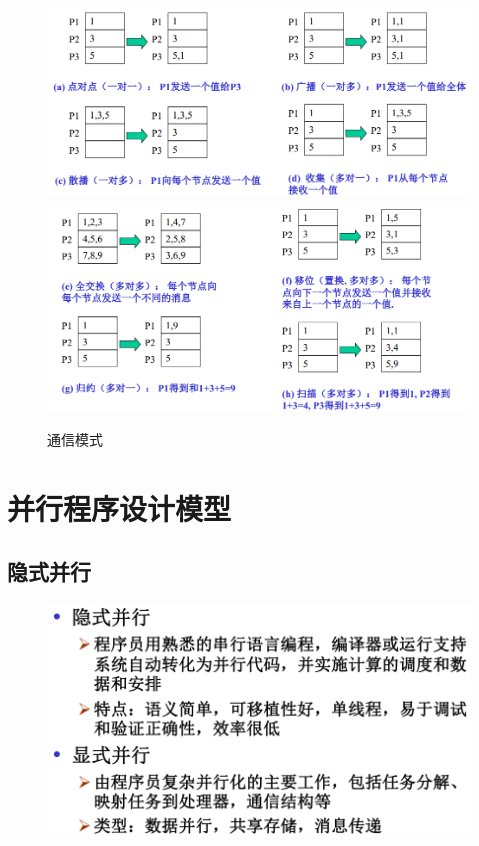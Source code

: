 \documentclass[UTF8,a4paper]{ctexart}
\begin{document}
\begin{figure}[H]
  \centering
  \includegraphics[scale = 0.3]{assets/ParallelComputing_4d016.png}
  \includegraphics[scale = 0.3]{assets/ParallelComputing_a4f5e.png}
  \caption{通信模式}
\end{figure}

\section{并行程序设计模型}
\subsection{隐式并行}
\begin{figure}[H]
  \centering
  \includegraphics[scale = 0.3]{assets/ParallelComputing_22b26.png}
\end{figure}
\end{document}
